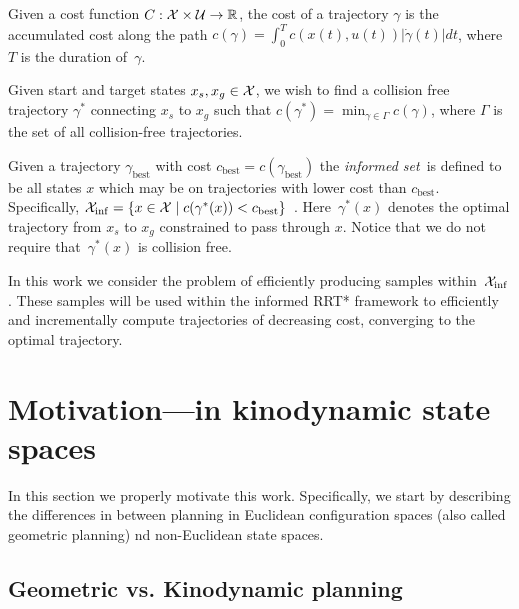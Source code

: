 \documentclass[letterpaper, 10 pt, conference]{ieeeconf}  %
\begin{document}
Given a cost function $C : \mathcal{X} \times \mathcal{U} \rightarrow \mathbb{R}$, the cost of a trajectory $ \gamma $ is the accumulated cost along the path
$c(\gamma) = \int_0^{T} c( x(t), u(t) ) |\dot{\gamma}(t)|dt$, 
where $T$ is the duration of~$\gamma$.

Given start and target states $x_s, x_g \in \mathcal{X}$, we wish to find a collision free trajectory $\gamma^*$ connecting $x_s$ to $x_g$ such that 
$c(\gamma^*) = \min_{\gamma \in \Gamma} c(\gamma)$, where $\Gamma$ is the set of all collision-free trajectories.

Given a trajectory $\gamma_{\text{best}}$ with cost $c_{\text{best}} = c(\gamma_{\text{best}})$ the \emph{informed set}~\Cinf is defined to be all states $x$  which may be on trajectories with lower cost than $c_{\text{best}}$.
Specifically,
$
\mathcal{X}_{\rm {inf}} = \{ x \in \mathcal{X} \mid  
		c ( \gamma^*(x) ) < c_{\rm best} \} $~\cite{GSB14}.
Here~$ \gamma^*(x) $ denotes the optimal trajectory  from $ x_s $ to $ x_g $ constrained to pass through $ x $.
Notice that we do not require that~$ \gamma^*(x) $ is collision free.

In this work we consider the problem of efficiently producing samples within~$\mathcal{X}_{\rm {inf}}$.
These samples will be used within the informed RRT* framework to efficiently and incrementally compute trajectories of decreasing cost, converging to the optimal trajectory.
\begin{prop}
	\label{prop:asym_opt}
\end{prop}


\section{Motivation---\Cinf in kinodynamic state spaces}
\label{sec:mtdi}

In this section we properly motivate this work.
Specifically, we start by describing the differences in between planning in Euclidean configuration spaces (also called geometric planning) nd non-Euclidean  state spaces.


\subsection{Geometric vs. Kinodynamic planning}
\end{document}
